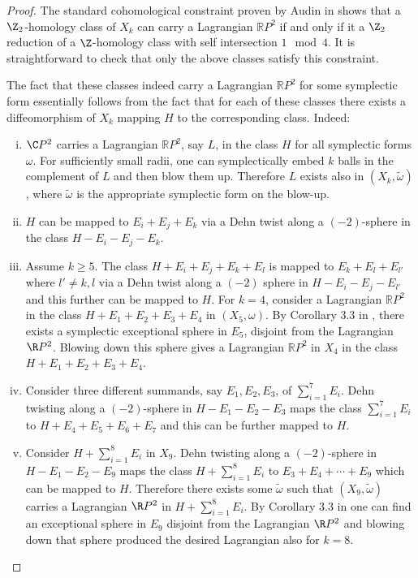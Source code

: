\begin{proof}
The standard cohomological constraint proven by Audin in \cite{AudinLag} shows that a $\Z_2$-homology class of $X_k$ can carry a Lagrangian $\mathbb{R}P^2$ if and only if it a $\Z_2$ reduction of a $\Z$-homology class with self intersection $1\mod 4$. It is straightforward to check that only the above classes satisfy this constraint.\par 
The fact that these classes indeed carry a Lagrangian $\mathbb{R}P^2$ for some symplectic form essentially follows from the fact that for each of these classes there exists a diffeomorphism of $X_k$ mapping $H$ to the corresponding class. Indeed:
\begin{enumerate}[i)]
    \item $\C P^2$ carries a Lagrangian $\mathbb{R}P^2$, say $L$, in the class $H$ for all symplectic forms $\omega$. For sufficiently small radii, one can symplectically embed $k$ balls in the complement of $L$ and then blow them up. Therefore $L$ exists also in $(X_k,\tilde{\omega})$, where $\tilde{\omega}$ is the appropriate symplectic form on the blow-up.
    
    \item $H$ can be mapped to $E_i+E_j+E_k$ via a Dehn twist along a $(-2)$-sphere in the class $H-E_i-E_j-E_k$.
   
    \item Assume $k\geq 5$. The class $H+E_i+E_j+E_k+E_l$ is mapped to $E_k+E_l+E_{l'}$ where $l'\neq k,l$ via a Dehn twist along a $(-2)$ sphere in $H-E_i-E_j-E_{l'}$ and this further can be mapped to $H$. For $k=4$, consider a Lagrangian $\mathbb{R}P^2$ in the class $H+E_1+E_2+E_3+E_4$ in $(X_5,\omega)$. By Corollary 3.3 in \cite{BLW}, there exists a symplectic exceptional sphere in $E_5$, disjoint from the Lagrangian $\R P^2$. Blowing down this sphere gives a Lagrangian $\mathbb{R}P^2$ in $X_4$ in the class $H+E_1+E_2+E_3+E_4$.
    
    \item Consider three different summands, say $E_1,E_2,E_3$, of $\sum_{i=1}^7 E_i$. Dehn twisting along a $(-2)$-sphere in $H-E_1-E_2-E_3$ maps the class $\sum_{i=1}^7 E_i$ to $H+E_4+E_5+E_6+E_7$ and this can be further mapped to $H$.

    \item Consider $H+\sum_{i=1}^8 E_i$ in $X_9$. Dehn twisting along a $(-2)$-sphere in $H-E_1-E_2-E_{9}$ maps the class $H+\sum_{i=1}^8 E_i$ to $E_3+E_4+\cdots + E_9$ which can be mapped to $H$. Therefore there exists some $\tilde{\omega}$ such that $(X_9,\tilde{\omega})$ carries a Lagrangian $\R P^2$ in $H+\sum_{i=1}^8 E_i$. By Corollary 3.3 in \cite{BLW} one can find an exceptional sphere in $E_9$ disjoint from the Lagrangian $\R P^2$ and blowing down that sphere produced the desired Lagrangian also for $k=8$.
\end{enumerate}
\end{proof}













